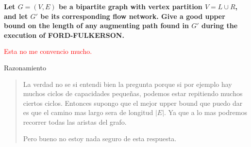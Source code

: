 \textbf{Let $G = (V, E)$ be a bipartite graph with vertex partition $V = L \cup R$, and let $G'$ be its corresponding flow network. Give a good upper bound on the length of any augmenting path found in $G'$ during the execution of FORD-FULKERSON.}\vspace{.2cm}

\textcolor{red}{Esta no me convencio mucho.}\vspace{.2cm}

\textcolor{bibi}{Razonamiento}
\begin{quote}
    La verdad no se si entendi bien la pregunta porque si por ejemplo hay muchos ciclos de capacidades pequeñas, podemos estar repitiendo muchos ciertos ciclos. Entonces supongo que el mejor upper bound que puedo dar es que el camino mas largo sera de longitud $|E|$. Ya que a lo mas podremos recorrer todas las aristas del grafo. \vspace{.2cm}

    Pero bueno no estoy nada seguro de esta respuesta. \vspace{.2cm}
\end{quote}